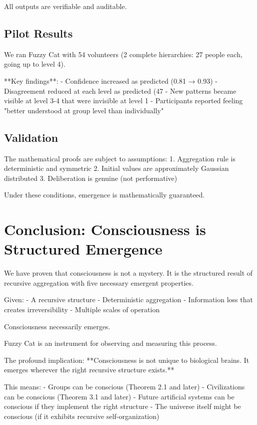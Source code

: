 \documentclass[12pt,a4paper]{article}
\theoremstyle{definition}
\begin{document}
{All outputs are verifiable and auditable.

\subsection{Pilot Results}

We ran Fuzzy Cat with 54 volunteers (2 complete hierarchies: 27 people each, going up to level 4).

**Key findings**:
- Confidence increased as predicted (0.81 → 0.93)
- Disagreement reduced at each level as predicted (47%
- New patterns became visible at level 3-4 that were invisible at level 1
- Participants reported feeling "better understood at group level than individually"

\subsection{Validation}

The mathematical proofs are subject to assumptions:
1. Aggregation rule is deterministic and symmetric
2. Initial values are approximately Gaussian distributed
3. Deliberation is genuine (not performative)

Under these conditions, emergence is mathematically guaranteed.

\section{Conclusion: Consciousness is Structured Emergence}

We have proven that consciousness is not a mystery. It is the structured result of recursive aggregation with five necessary emergent properties.

Given:
- A recursive structure
- Deterministic aggregation
- Information loss that creates irreversibility
- Multiple scales of operation

Consciousness necessarily emerges.

Fuzzy Cat is an instrument for observing and measuring this process.

The profound implication: **Consciousness is not unique to biological brains. It emerges wherever the right recursive structure exists.**

This means:
- Groups can be conscious (Theorem 2.1 and later)
- Civilizations can be conscious (Theorem 3.1 and later)
- Future artificial systems can be conscious if they implement the right structure
- The universe itself might be conscious (if it exhibits recursive self-organization)

}
\end{document}
